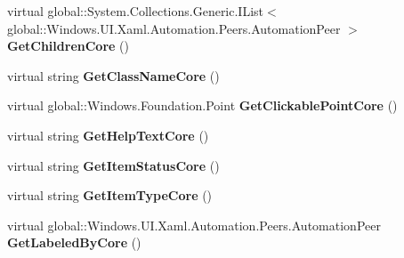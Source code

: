 \begin{DoxyCompactItemize}
\mbox{\label{class_windows_1_1_u_i_1_1_xaml_1_1_automation_1_1_peers_1_1_automation_peer_a09114f6788a9e206e93a6ffbd12620bf}} 
virtual global\+::\+System.\+Collections.\+Generic.\+I\+List$<$ global\+::\+Windows.\+U\+I.\+Xaml.\+Automation.\+Peers.\+Automation\+Peer $>$ {\bfseries Get\+Children\+Core} ()
\item 
\mbox{\label{class_windows_1_1_u_i_1_1_xaml_1_1_automation_1_1_peers_1_1_automation_peer_a11d5725a1c02165300ffbcf264f7b2b3}} 
virtual string {\bfseries Get\+Class\+Name\+Core} ()
\item 
\mbox{\label{class_windows_1_1_u_i_1_1_xaml_1_1_automation_1_1_peers_1_1_automation_peer_a08e12f22ea4a043975f822abaf961ce4}} 
virtual global\+::\+Windows.\+Foundation.\+Point {\bfseries Get\+Clickable\+Point\+Core} ()
\item 
\mbox{\label{class_windows_1_1_u_i_1_1_xaml_1_1_automation_1_1_peers_1_1_automation_peer_a7a8535136acdad3cca9f8c95a6ecc9e0}} 
virtual string {\bfseries Get\+Help\+Text\+Core} ()
\item 
\mbox{\label{class_windows_1_1_u_i_1_1_xaml_1_1_automation_1_1_peers_1_1_automation_peer_a7531b623b14754b9f333f073e787370c}} 
virtual string {\bfseries Get\+Item\+Status\+Core} ()
\item 
\mbox{\label{class_windows_1_1_u_i_1_1_xaml_1_1_automation_1_1_peers_1_1_automation_peer_ab7e73605b4d6af50ce1e8d3be13f718c}} 
virtual string {\bfseries Get\+Item\+Type\+Core} ()
\item 
\mbox{\label{class_windows_1_1_u_i_1_1_xaml_1_1_automation_1_1_peers_1_1_automation_peer_a7b381b450ce7bad769a25c534aecc3a7}} 
virtual global\+::\+Windows.\+U\+I.\+Xaml.\+Automation.\+Peers.\+Automation\+Peer {\bfseries Get\+Labeled\+By\+Core} ()

\end{DoxyCompactItemize}
